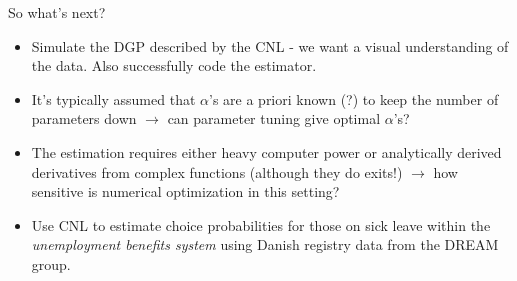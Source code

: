 \documentclass[10pt]{beamer}
\begin{document}
\begin{frame}{So what's next?}
  \begin{itemize}
    \item Simulate the DGP described by the CNL - we want a visual understanding of the data. Also successfully code the estimator.
    \item It's typically assumed that $\alpha$'s are a priori known (?) to keep the number of parameters down $\rightarrow$ can parameter tuning give optimal $\alpha$'s?
    \item The estimation requires either heavy computer power or analytically derived derivatives from complex functions (although they do exits!) $\rightarrow$ how sensitive is numerical optimization in this setting?
    \item Use CNL to estimate choice probabilities for those on sick leave within the \textit{unemployment benefits system} using Danish registry data from the DREAM group.
  \end{itemize}
\end{frame}
\end{document}

